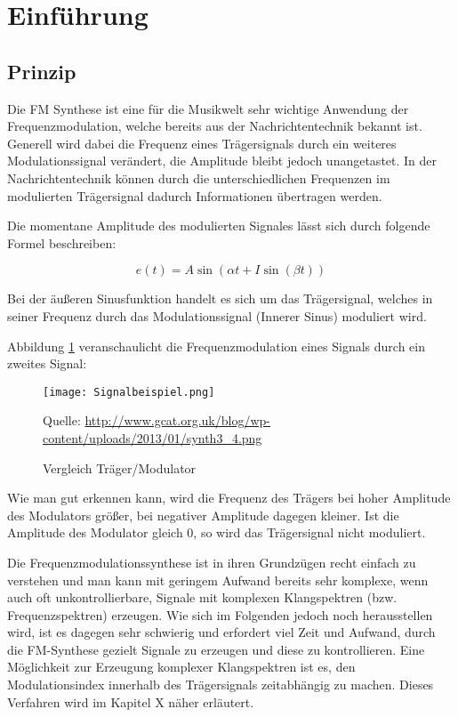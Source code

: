 \section{Einführung}

\subsection{Prinzip}
Die FM Synthese ist eine für die Musikwelt sehr wichtige Anwendung der Frequenzmodulation, welche bereits aus der Nachrichtentechnik bekannt ist. Generell wird dabei die Frequenz eines Trägersignals durch ein weiteres Modulationssignal verändert, die Amplitude bleibt jedoch unangetastet. In der Nachrichtentechnik können durch die unterschiedlichen Frequenzen im modulierten Trägersignal dadurch Informationen übertragen werden. 

Die momentane Amplitude des modulierten Signales lässt sich durch folgende Formel beschreiben:

\[
e(t) = A\sin(\alpha t + I\sin(\beta t)) 
\]

Bei der äußeren Sinusfunktion handelt es sich um das Trägersignal, welches in seiner Frequenz durch das Modulationssignal (Innerer Sinus) moduliert wird.


Abbildung \ref{fig:vergleichSignale} veranschaulicht die Frequenzmodulation eines Signals durch ein zweites Signal:

\begin{figure} [ht]
\centering
  \texttt{[image: Signalbeispiel.png]}
\caption{Vergleich Träger/Modulator}
\label{fig:vergleichSignale}
Quelle: \url{http://www.gcat.org.uk/blog/wp-content/uploads/2013/01/synth3_4.png}
\end{figure}

Wie man gut erkennen kann, wird die Frequenz des Trägers bei hoher Amplitude des Modulators größer, bei negativer Amplitude dagegen kleiner. Ist die Amplitude des Modulator gleich 0, so wird das Trägersignal nicht moduliert.

Die Frequenzmodulationssynthese ist in ihren Grundzügen recht einfach zu verstehen und man kann mit geringem  Aufwand bereits sehr komplexe, wenn auch oft unkontrollierbare, Signale mit komplexen Klangspektren (bzw. Frequenzspektren) erzeugen. Wie sich im Folgenden jedoch noch herausstellen wird, ist es dagegen sehr schwierig und erfordert viel Zeit und Aufwand, durch die FM-Synthese gezielt Signale zu erzeugen und diese zu kontrollieren. Eine Möglichkeit zur Erzeugung komplexer Klangspektren ist es, den Modulationsindex innerhalb des Trägersignals zeitabhängig zu machen. Dieses Verfahren wird im Kapitel X näher erläutert.

